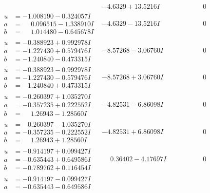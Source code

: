 \documentclass[1p]{elsarticle_modified}
\theoremstyle{definition}
\begin{document}
$$\begin{array}{c|c|c}
 & -4.6329 + 13.5216 I & \phantom{-0.000000 } 0 \\ \hline\begin{aligned}
u &= -1.008190 - 0.324057 I \\
a &= \phantom{-}0.096515 - 1.338910 I \\
b &= \phantom{-}1.014480 - 0.645678 I\end{aligned}
 & -4.6329 - 13.5216 I & \phantom{-0.000000 } 0 \\ \hline\begin{aligned}
u &= -0.388923 + 0.992978 I \\
a &= -1.227430 + 0.579476 I \\
b &= -1.240840 - 0.473315 I\end{aligned}
 & -8.57268 - 3.06760 I & \phantom{-0.000000 } 0 \\ \hline\begin{aligned}
u &= -0.388923 - 0.992978 I \\
a &= -1.227430 - 0.579476 I \\
b &= -1.240840 + 0.473315 I\end{aligned}
 & -8.57268 + 3.06760 I & \phantom{-0.000000 } 0 \\ \hline\begin{aligned}
u &= -0.260397 + 1.035270 I \\
a &= -0.357235 + 0.222552 I \\
b &= \phantom{-}1.26943 - 1.28560 I\end{aligned}
 & -4.82531 - 6.86098 I & \phantom{-0.000000 } 0 \\ \hline\begin{aligned}
u &= -0.260397 - 1.035270 I \\
a &= -0.357235 - 0.222552 I \\
b &= \phantom{-}1.26943 + 1.28560 I\end{aligned}
 & -4.82531 + 6.86098 I & \phantom{-0.000000 } 0 \\ \hline\begin{aligned}
u &= -0.914197 + 0.099427 I \\
a &= -0.635443 + 0.649586 I \\
b &= -0.789762 + 0.116454 I\end{aligned}
 & \phantom{-}0.36402 - 4.17697 I & \phantom{-0.000000 } 0 \\ \hline\begin{aligned}
u &= -0.914197 - 0.099427 I \\
a &= -0.635443 - 0.649586 I \\

\end{aligned}
\end{array}$$
\end{document}
